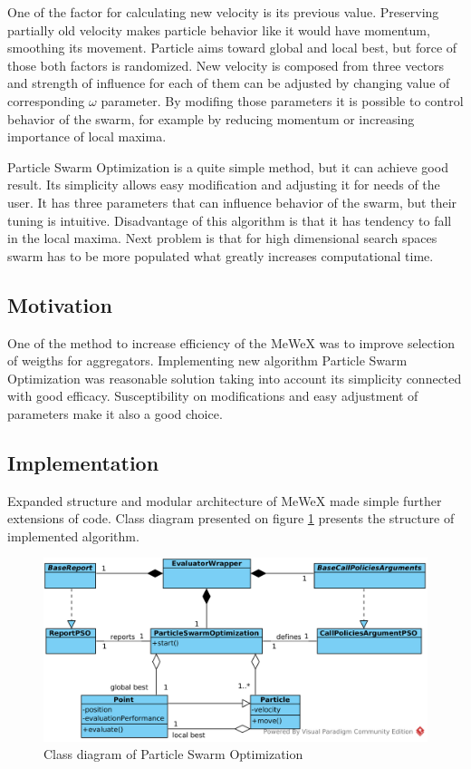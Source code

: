 One of the factor for calculating new velocity is its previous value. Preserving partially old velocity makes particle behavior 
like it would have momentum, smoothing its movement. Particle aims toward global and local best, but force of those both factors is randomized.
New velocity is composed from three vectors and strength of influence for each of them can be adjusted by changing value 
of corresponding \(\omega\) parameter. By modifing those parameters it is possible to control behavior of the swarm, for example 
by reducing momentum or increasing importance of local maxima.

Particle Swarm Optimization is a quite simple method, but it can achieve good result. Its simplicity allows easy modification and adjusting 
it for needs of the user. It has three parameters that can influence behavior of the swarm, but their tuning is intuitive. 
Disadvantage of this algorithm is that it has tendency to fall in the local maxima. Next problem is that for high dimensional search spaces 
swarm has to be more populated what greatly increases computational time. 

\subsection{Motivation}
One of the method to increase efficiency of the MeWeX was to improve selection of weigths for aggregators. 
Implementing new algorithm Particle Swarm Optimization was reasonable solution taking into account its simplicity 
connected with good efficacy. Susceptibility on modifications and easy adjustment of parameters make it also a good choice.

\subsection{Implementation}
Expanded structure and modular architecture of MeWeX made simple further extensions of code. Class diagram presented on figure \ref{img_pso_class}
presents the structure of implemented algorithm.
\begin{figure}[ht]
\centering
    \includegraphics[scale=0.2]{img/pso_class.png}
    \caption{Class diagram of Particle Swarm Optimization}
    \label{img_pso_class}
\end{figure}


